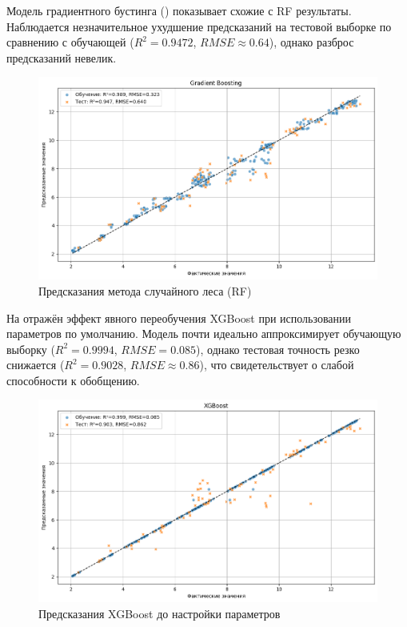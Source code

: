 Модель градиентного бустинга () показывает схожие с RF результаты. Наблюдается незначительное ухудшение предсказаний на тестовой выборке по сравнению с обучающей ($R^2 = 0.9472$, $RMSE \approx 0.64$), однако разброс предсказаний невелик.

\begin{figure}[htbp!]
	\centering
	\includegraphics[width=.9\linewidth]{my_folder/images/coverage/Gradient-Boosting.png}
	\caption{Предсказания метода случайного леса (RF)} 
	\label{fig:coverage-gbr}  
\end{figure}

На   отражён эффект явного переобучения XGBoost при использовании параметров по умолчанию. Модель почти идеально аппроксимирует обучающую выборку ($R^2 = 0.9994$, $RMSE = 0.085$), однако тестовая точность резко снижается ($R^2 = 0.9028$, $RMSE \approx 0.86$), что свидетельствует о слабой способности к обобщению. 

\begin{figure}[htbp!]
	\centering
	\includegraphics[width=.9\linewidth]{my_folder/images/coverage/XGBoost-overfiting.png}
	\caption{Предсказания XGBoost до настройки параметров} 
	\label{fig:coverage-xgboost-overfit}  
\end{figure}

